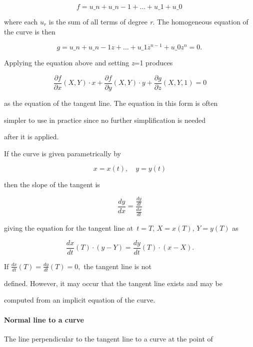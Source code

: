 {{{$$f=u\_n+u\_{n-1}+\dots+u\_1+u\_0\,$$ 



where each \textit{$u_r$} is the sum of all terms of degree \textit{r}. The homogeneous equation of the curve is then



$$g=u\_n+u\_{n-1}z+\dots+u\_1 z^{n-1}+u\_0 z^n=0.\,$$ 



Applying the equation above and setting \textit{z}=1 produces



$$\frac{\partial f}{\partial x}(X,Y) \cdot x + \frac{\partial f}{\partial y}(X,Y) \cdot y + \frac{\partial g}{\partial z}(X,Y,1) =0$$



as the equation of the tangent line. The equation in this form is often

simpler to use in practice since no further simplification is needed

after it is applied.



If the curve is given parametrically by



$$x=x(t),\quad y=y(t)$$ 



then the slope of the tangent is



$$\frac{dy}{dx}=\frac{\frac{dy}{dt}}{\frac{dx}{dt}}$$ 



giving the equation for the tangent line at $\, t=T, \, X=x(T), \, Y=y(T)$ as



$$\frac{dx}{dt}(T) \cdot (y-Y)=\frac{dy}{dt}(T) \cdot (x-X).$$



If $\frac{dx}{dt}(T)= \frac{dy}{dt}(T) =0,$ the tangent line is not

defined. However, it may occur that the tangent line exists and may be

computed from an implicit equation of the curve.



\paragraph{Normal line to a curve}



The line perpendicular to the tangent line to a curve at the point of

}}}

